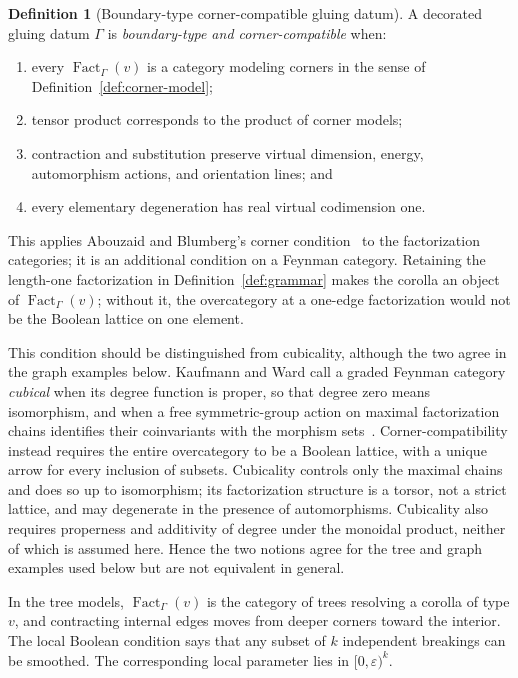 \documentclass[11pt,letterpaper,twoside]{article}
\theoremstyle{plain}
\theoremstyle{definition}
\newtheorem{definition}[theorem]{Definition}
\theoremstyle{remark}
\let\cite\citep
\DeclareMathOperator{\Fact}{Fact}
\begin{document}
\begin{definition}[Boundary-type corner-compatible gluing datum]\label{def:ccf}
A decorated gluing datum \(\Gamma\) is \emph{boundary-type and corner-compatible} when:
\begin{enumerate}
\item every \(\Fact_\Gamma(v)\) is a category modeling corners in the sense of Definition~\ref{def:corner-model};
\item tensor product corresponds to the product of corner models;
\item contraction and substitution preserve virtual dimension, energy, automorphism actions, and orientation lines; and
\item every elementary degeneration has real virtual codimension one.
\end{enumerate}
This applies Abouzaid and Blumberg's corner condition~\cite{abouzaidblumberg2024} to the factorization categories; it is an additional condition on a Feynman category.  Retaining the length-one factorization in Definition~\ref{def:grammar} makes the corolla an object of \(\Fact_\Gamma(v)\); without it, the overcategory at a one-edge factorization would not be the Boolean lattice on one element.
\end{definition}

This condition should be distinguished from cubicality, although the two agree in the graph examples below.  Kaufmann and Ward call a graded Feynman category \emph{cubical} when its degree function is proper, so that degree zero means isomorphism, and when a free symmetric-group action on maximal factorization chains identifies their coinvariants with the morphism sets~\cite{kaufmannward2017,kaufmannward2023koszul}.  Corner-compatibility instead requires the entire overcategory to be a Boolean lattice, with a unique arrow for every inclusion of subsets.  Cubicality controls only the maximal chains and does so up to isomorphism; its factorization structure is a torsor, not a strict lattice, and may degenerate in the presence of automorphisms.  Cubicality also requires properness and additivity of degree under the monoidal product, neither of which is assumed here.  Hence the two notions agree for the tree and graph examples used below but are not equivalent in general.

In the tree models, \(\Fact_\Gamma(v)\) is the category of trees resolving a corolla of type \(v\), and contracting internal edges moves from deeper corners toward the interior.  The local Boolean condition says that any subset of \(k\) independent breakings can be smoothed.  The corresponding local parameter lies in \([0,\varepsilon)^k\).
\end{document}
